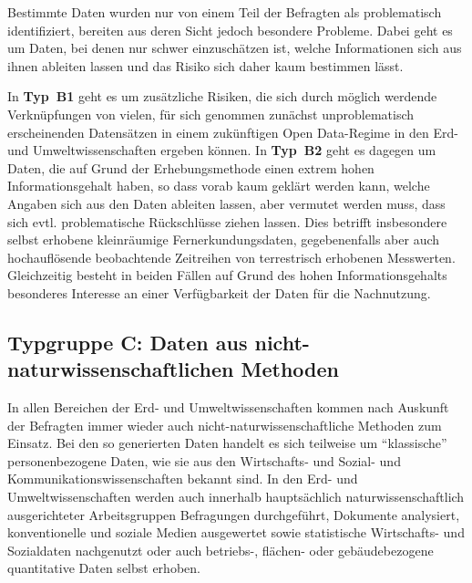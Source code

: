 \documentclass[a4paper,
fontsize=11pt,
oneside,
numbers=noperiodatend,
parskip=half-,
bibliography=totoc,
final
]{scrartcl}
\begin{document}
Bestimmte Daten wurden nur von einem Teil der Befragten als
problematisch identifiziert, bereiten aus deren Sicht jedoch besondere
Probleme. Dabei geht es um Daten, bei denen nur schwer einzuschätzen
ist, welche Informationen sich aus ihnen ableiten lassen und das Risiko
sich daher kaum bestimmen lässt.

In \textbf{Typ~B1} geht es um zusätzliche Risiken, die sich durch
möglich werdende Verknüpfungen von vielen, für sich genommen zunächst
unproblematisch erscheinenden Datensätzen in einem zukünftigen Open
Data-Regime in den Erd- und Umweltwissenschaften ergeben können. In
\textbf{Typ~B2} geht es dagegen um Daten, die auf Grund der
Erhebungsmethode einen extrem hohen Informationsgehalt haben, so dass
vorab kaum geklärt werden kann, welche Angaben sich aus den Daten
ableiten lassen, aber vermutet werden muss, dass sich evtl.
problematische Rückschlüsse ziehen lassen. Dies betrifft insbesondere
selbst erhobene kleinräumige Fernerkundungsdaten, gegebenenfalls aber
auch hochauflösende beobachtende Zeitreihen von terrestrisch erhobenen
Messwerten. Gleichzeitig besteht in beiden Fällen auf Grund des hohen
Informationsgehalts besonderes Interesse an einer Verfügbarkeit der
Daten für die Nachnutzung.

\hypertarget{typgruppe-c-daten-aus-nicht-naturwissenschaftlichen-methoden}{%
\subsection{Typgruppe C: Daten aus nicht-naturwissenschaftlichen Methoden}\label{typgruppe-c-daten-aus-nicht-naturwissenschaftlichen-methoden}}

In allen Bereichen der Erd- und Umweltwissenschaften kommen nach
Auskunft der Befragten immer wieder auch nicht-naturwissenschaftliche
Methoden zum Einsatz. Bei den so generierten Daten handelt es sich
teilweise um \enquote{klassische} personenbezogene Daten, wie sie aus
den Wirtschafts- und Sozial- und Kommunikationswissenschaften bekannt
sind. In den Erd- und Umweltwissenschaften werden auch innerhalb
hauptsächlich naturwissenschaftlich ausgerichteter Arbeitsgruppen
Befragungen durchgeführt, Dokumente analysiert, konventionelle und
soziale Medien ausgewertet sowie statistische Wirtschafts- und
Sozialdaten nachgenutzt oder auch betriebs-, flächen- oder
gebäudebezogene quantitative Daten selbst erhoben.
\end{document}
